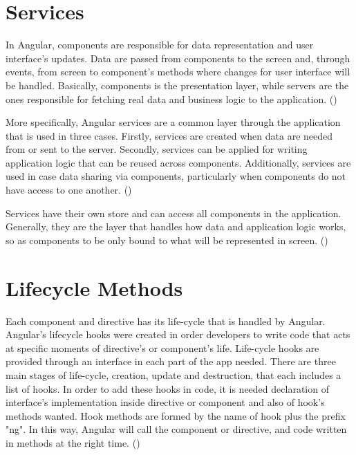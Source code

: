 \section{Services}

In Angular, components are responsible for data representation and user interface's updates. Data are passed from components to the screen and, through events, from screen to component's methods where changes for user interface  will be handled. Basically, components is the presentation layer, while servers are the ones responsible for fetching real data and business logic to the application. (\cite{murray2018ng}) \par

More specifically, Angular services are a common layer through the application that is used in three cases. Firstly, services are created when data are needed from or sent to the server. Secondly, services can be applied for writing application logic that can be reused across components. Additionally, services are used in case data sharing via components, particularly when components do not have access to one another. (\cite{angularUpandRunning}) \par

Services have their own store and can access all components in the application. Generally, they are the layer that handles how data and application logic works, so as components to be only bound to what will be represented in screen. (\cite{angularUpandRunning}) \par

\section{Lifecycle Methods}

Each component and directive has its life-cycle that is handled by Angular. Angular's lifecycle hooks were created in order developers to write code that acts at specific moments of directive's or component's life. Life-cycle hooks are provided through an interface in each part of the app needed. There are three main stages of life-cycle, creation, update and destruction, that each includes a list of hooks. In order to add these hooks in code, it is needed declaration of interface's implementation inside directive or component and also of hook's methods wanted. Hook methods are formed by the name of hook plus the prefix "ng". In this way, Angular will call the component or directive, and code written in methods at the right time. (\cite{murray2018ng}) \par

